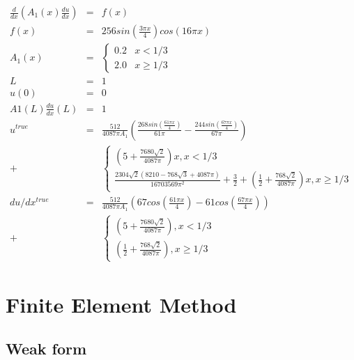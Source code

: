 \documentclass[a4paper, 12pt]{article} %
\begin{document}
\begin{eqnarray}
\frac{d}{dx}(A_1(x) \frac{du}{dx}) &=& f(x)\nonumber\\
f(x)&=&256sin(\frac{3\pi x}{4})cos(16 \pi x) \nonumber\\
A_1(x) & = &     
\begin{cases}
       0.2 & x < 1/3\\
       2.0 & x \geq 1/3 
\end{cases}\nonumber\\
L &=& 1 \nonumber\\
u(0) & =& 0 \nonumber\\
A1(L)\frac{du}{dx}(L) &=& 1 \nonumber\\
u^{true} &=& \frac{512}{4087 \pi A_1} (\frac{268 sin(\frac{61\pi x}{4})} {61\pi} - \frac{244 sin(\frac{67 \pi x}{4})}{67 \pi}) \nonumber\\
+
   & & \begin{cases}
        (5+\frac{7680 \sqrt{2}}{4087 \pi}) x,  x < 1/3\\
       \frac{2304 \sqrt{2} (8210 - 768 \sqrt{3} + 4087 \pi)}{16703569 \pi ^2} + \frac{3}{2} + (\frac{1}{2} + \frac{768 \sqrt{2}} {4087 \pi}) x, x \geq 1/3 
    \end{cases} \nonumber\\
du/dx^{true} &=& \frac{512}{4087 \pi A_1} (67 cos(\frac{61\pi x}{4}) - 61cos(\frac{67 \pi x}{4}) )\nonumber\\
+  & & \begin{cases}
        (5+\frac{7680 \sqrt{2}}{4087 \pi}),  x < 1/3\\
        (\frac{1}{2} + \frac{768 \sqrt{2}} {4087 \pi}), x \geq 1/3 
        \end{cases}
\end{eqnarray}



\section{Finite Element Method}

\subsection{Weak form}
\end{document}

